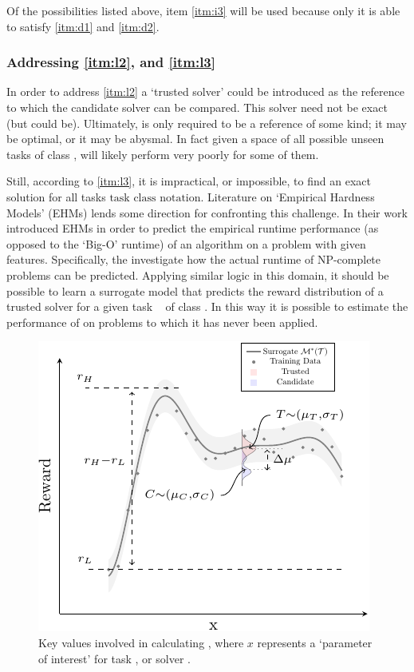         Of the possibilities listed above, item \ref{itm:i3} will be used because only it is able to satisfy \ref{itm:d1} and \ref{itm:d2}.

    \subsubsection{Addressing \ref{itm:l2}, and \ref{itm:l3}} \label{sec:practicality}
        In order to address \ref{itm:l2} a `trusted solver' \solvestar{} could be introduced as the reference to which the candidate solver \solve{} can be compared. This solver need not be exact (but could be). Ultimately, \solvestar{} is only required to be a reference of some kind; it may be optimal, or it may be abysmal. In fact given a space of all possible unseen tasks of class \taskclass, \solvestar{} will likely perform very poorly for some of them.

        Still, according to \ref{itm:l3}, it is impractical, or impossible, to find an exact solution for all tasks $\text{task class notation}$. Literature on `Empirical Hardness Models' (EHMs) lends some direction for confronting this challenge. In their work \cite{Leyton-Brown2009-yr,Hutter2009-og} introduced EHMs in order to predict the empirical runtime performance (as opposed to the `Big-O' runtime) of an algorithm on a problem with given features. Specifically, the investigate how the actual runtime of NP-complete problems can be predicted. Applying similar logic in this domain, it should be possible to learn a surrogate model \surrogate{} that predicts the reward distribution \rwdstarapprox{} of a trusted solver \solvestar{} for a given task \task~ of class \taskclass. In this way it is possible to estimate the performance of \solvestar{} on problems to which it has never been applied.
        
   \begin{figure}[tb]
        \centering
        \includegraphics[width=0.75\linewidth]{Figures/sq_v2_fig-crop}
        \caption{Key values involved in calculating \xQ, where $x$ represents a `parameter of interest' for task \task, or solver \solve.}
        \label{fig:sq_v2}
    \end{figure}
